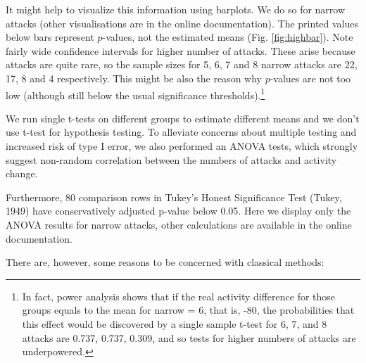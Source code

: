 \documentclass[
  10pt,
  dvipsnames]{scrartcl}
\begin{document}
It might help to visualize this information using barplots. We do so for
narrow attacks (other visualisations are in the online documentation).
The printed values below bars represent \(p\)-values, not the estimated
means (Fig. \ref{fig:highbar}). Note fairly wide confidence intervals
for higher number of attacks. These arise because attacks are quite
rare, so the sample sizes for 5, 6, 7 and 8 narrow attacks are 22, 17, 8
and 4 respectively. This might be also the reason why \(p\)-values are
not too low (although still below the usual significance
thresholds).\footnote{In fact, power analysis shows that if the real activity difference for those groups equals to the mean for \textsf{narrow = 6}, that is, -80, the probabilities that this effect would be discovered by a single sample t-test for 6, 7, and 8 attacks are 0.737, 0.737, 0.309, and so tests for higher numbers of attacks are underpowered.}

\begin{table}[H]
\caption{ANOVA for activity change vs. narrow \\ attacks received.}
\label{tab:anovanarrow}
\end{table}

We run single t-tests on different groups to estimate different means
and we don't use t-test for hypothesis testing. To alleviate concerns
about multiple testing and increased risk of type I error, we also
performed an ANOVA tests, which strongly suggest non-random correlation
between the numbers of attacks and activity change.

Furthermore, 80 comparison rows in Tukey's Honest Significance Test
(Tukey, 1949) have conservatively adjusted p-value below 0.05. Here we
display only the ANOVA results for narrow attacks, other calculations
are available in the online documentation.

There are, however, some reasons to be concerned with classical methods:
\end{document}
